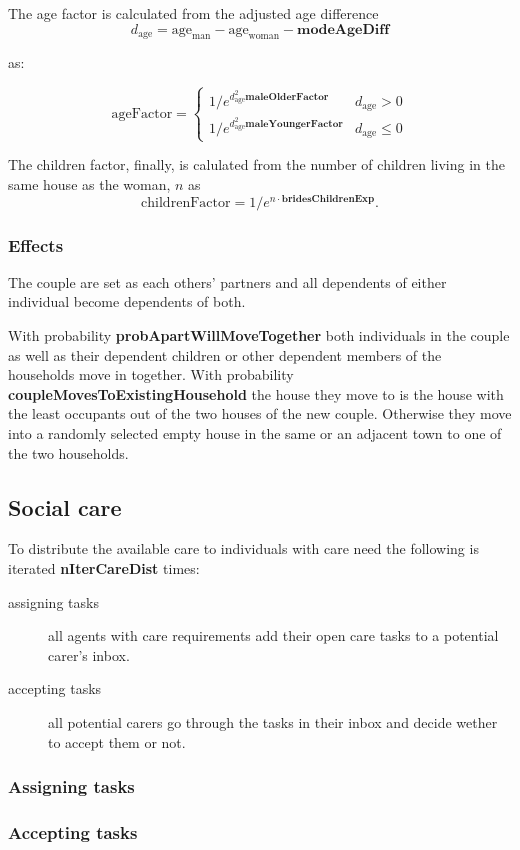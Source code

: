 \documentclass{article}
\newcommand{\marginnote}[1]{\protect\marginpar{\small\texttt{#1}}}
\begin{document}
The age factor is calculated from the adjusted age difference 
\[
d_\mathrm{age} = \mathrm{age}_\mathrm{man} - \mathrm{age}_\mathrm{woman} - \mathbf{modeAgeDiff}
\]

as:

\[
\mathrm{ageFactor} = \left\{
    \begin{array}{ll}
    1/e^{d_\mathrm{age}^2\mathbf{maleOlderFactor}} & d_\mathrm{age} > 0 \\
    1/e^{d_\mathrm{age}^2\mathbf{maleYoungerFactor}} & d_\mathrm{age} \leq 0 
    \end{array}
    \right.
\]

The children factor, finally, is calulated from the number of children living in the same house as the woman, $n$ as 
\[
\mathrm{childrenFactor} = 1/e^{n \cdot \mathbf{bridesChildrenExp}}.
\]


\subsubsection*{Effects}

The couple are set as each others' partners and all dependents of either individual become dependents of both.

With probability \textbf{probApartWillMoveTogether} both individuals in the couple as well as their dependent children or other dependent members of the households move in together. With probability \textbf{coupleMovesToExistingHousehold} the house they move to is the house with the least occupants out of the two houses of the new couple.  Otherwise they move into a randomly selected empty house in the same or an adjacent town to one of the two households.


\subsection{Social care \marginnote{TasksCare.jl}}

To distribute the available care to individuals with care need the following is iterated \textbf{nIterCareDist} times:

\begin{description}

\item[assigning tasks] all agents with care requirements add their open care tasks to a potential carer's inbox.

\item[accepting tasks] all potential carers go through the tasks in their inbox and decide wether to accept them or not.

\end{description}

\subsubsection*{Assigning tasks}

\subsubsection*{Accepting tasks}
\end{document}
